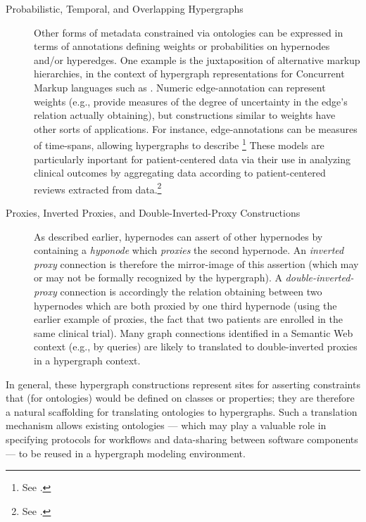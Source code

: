 {\begin{description}
\item[Probabilistic, Temporal, and Overlapping Hypergraphs]
Other forms of metadata constrained via ontologies 
can be expressed in terms of annotations 
defining weights or probabilities on 
hypernodes and/or hyperedges.  One example is 
the juxtaposition of alternative markup hierarchies, 
in the context of hypergraph representations for 
Concurrent Markup languages such as \TAGML{}.  
Numeric edge-annotation can represent 
weights (e.g., provide measures of the degree 
of uncertainty in the edge's relation actually 
obtaining), but constructions similar to 
weights have other sorts of applications.  
For instance, edge-annotations can be measures 
of time-spans, allowing hypergraphs to 
describe \footnote{See 
.}  These models are particularly inportant 
for patient-centered data via their use in 
analyzing clinical outcomes by aggregating data 
according to patient-centered reviews 
extracted from \EHR{} 
data.\footnote{See .}
  
\item[Proxies, Inverted Proxies, and Double-Inverted-Proxy Constructions]
As described earlier, hypernodes can assert  of 
other hypernodes by containing a \textit{hyponode} which 
\textit{proxies} the second hypernode.  
An \textit{inverted proxy} connection is therefore 
the mirror-image of this assertion 
(which may or may not be formally recognized 
by the hypergraph).  A \textit{double-inverted-proxy} 
connection is accordingly the relation obtaining 
between two hypernodes which are both proxied by 
one third hypernode (using the earlier example 
of proxies, the fact that two patients 
are enrolled in the same clinical trial).  
Many graph connections identified in a 
Semantic Web context (e.g., by \SPARQL{} queries) 
are likely to translated to double-inverted proxies 
in a hypergraph context.  
\end{description}

In general, these hypergraph constructions represent 
sites for asserting constraints that 
(for \RDF{} ontologies) would be defined on 
classes or properties; they are therefore 
a natural scaffolding for translating \RDF{} ontologies 
to hypergraphs.  Such a translation 
mechanism allows existing ontologies 
--- which may play a valuable role 
in specifying protocols for workflows 
and data-sharing between software components  
--- to be reused in a hypergraph modeling environment.}

